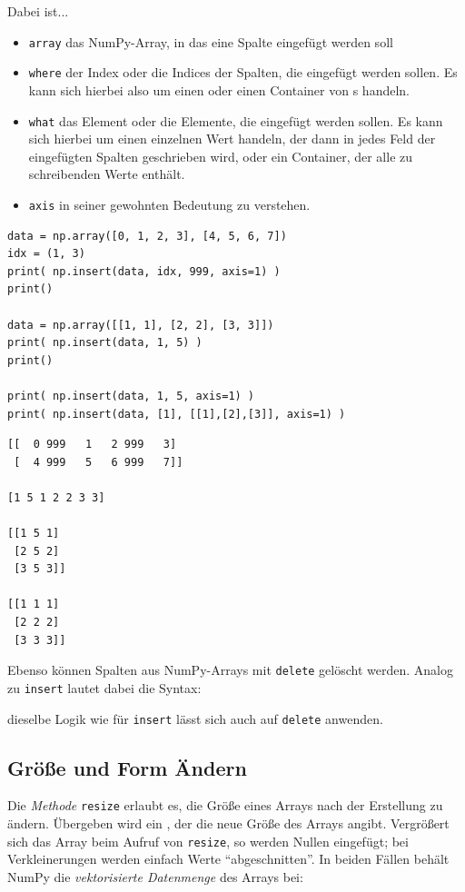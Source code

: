 Dabei ist...
\begin{itemize}
\item \texttt{array} das NumPy-Array, in das eine Spalte eingefügt werden soll
\item \texttt{where} der Index oder die Indices der Spalten, die eingefügt werden sollen. Es kann sich hierbei also um einen  oder einen Container von
	s handeln.
\item \texttt{what} das Element oder die Elemente, die eingefügt werden sollen. Es kann sich hierbei um einen einzelnen Wert handeln, der dann in jedes Feld der
	eingefügten Spalten geschrieben wird, oder ein Container, der alle zu schreibenden Werte enthält.
\item \texttt{axis} in seiner gewohnten Bedeutung zu verstehen.
\end{itemize}

\begin{codebox}
\begin{verbatim}
data = np.array([0, 1, 2, 3], [4, 5, 6, 7])
idx = (1, 3)
print( np.insert(data, idx, 999, axis=1) )
print()

data = np.array([[1, 1], [2, 2], [3, 3]])
print( np.insert(data, 1, 5) )
print()

print( np.insert(data, 1, 5, axis=1) )
print( np.insert(data, [1], [[1],[2],[3]], axis=1) )
\end{verbatim}
\end{codebox}

\begin{cmdbox}
\begin{verbatim}
[[  0 999   1   2 999   3]
 [  4 999   5   6 999   7]]
 
[1 5 1 2 2 3 3]

[[1 5 1]
 [2 5 2]
 [3 5 3]]
 
[[1 1 1]
 [2 2 2]
 [3 3 3]]
\end{verbatim}
\end{cmdbox}

Ebenso können Spalten aus NumPy-Arrays mit \texttt{delete} gelöscht werden. Analog zu \texttt{insert} lautet dabei die Syntax:
\begin{center}
\end{center}
\ie dieselbe Logik wie für \texttt{insert} lässt sich auch auf \texttt{delete} anwenden.

\subsection{Größe und Form Ändern}
Die \emph{Methode} \texttt{resize} erlaubt es, die Größe eines Arrays nach der Erstellung zu ändern. Übergeben wird ein , der die neue Größe des Arrays angibt. Vergrößert sich das Array beim Aufruf von \texttt{resize}, so werden Nullen eingefügt; bei Verkleinerungen werden einfach Werte \enquote{abgeschnitten}. In beiden Fällen behält NumPy die \emph{vektorisierte Datenmenge} des Arrays bei:

